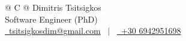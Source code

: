 \documentclass[a4paper,10pt]{article}
\begin{document}
\pagestyle{empty} 



\begin{tabularx}{\linewidth}{@{} C @{}}
\Huge{Dimitris Tsitsigkos} \\[7.5pt]
\Large{Software Engineer (PhD)} \\[7.5pt]


\href{mailto:tsitsigkosdim@gmail.com}{\raisebox{-0.05\height}\faEnvelope \ tsitsigkosdim@gmail.com} \ $|$ \
\href{tel:+30 6942951698}{\raisebox{-0.05\height}\faMobile \ +30 6942951698}
 \\
\end{tabularx}


\end{document}
